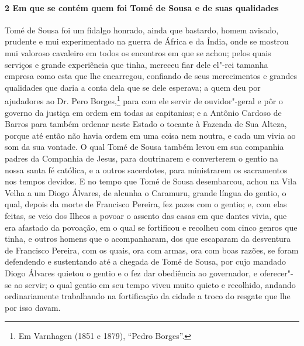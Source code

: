 \begin{linenumbers}
\paragraph{2 Em que se contém quem foi Tomé de Sousa e de suas qualidades} \quad
Tomé de Sousa foi um fidalgo honrado, ainda que bastardo, homem avisado, prudente e mui
experimentado na guerra de África e da Índia, onde se mostrou mui valoroso cavaleiro em
todos os encontros em que se achou; pelos quais serviços e grande experiência que tinha,
mereceu fiar dele el"-rei tamanha empresa como esta que lhe encarregou, confiando de seus
merecimentos e grandes qualidades que daria a conta dela que se dele esperava; a quem deu
por ajudadores ao Dr. Pero Borges,\footnote{ Em Varnhagen (1851 e 1879), ``Pedro
Borges''.} para com ele servir de ouvidor"-geral e pôr o governo da justiça em ordem em
todas as capitanias; e a Antônio Cardoso de Barros para também ordenar neste Estado o
tocante à Fazenda de Sua Alteza, porque até então não havia ordem em uma coisa nem noutra,
e cada um vivia ao som da sua vontade. O qual Tomé de Sousa também levou em sua companhia
padres da Companhia de Jesus, para doutrinarem e converterem o gentio na nossa santa fé
católica, e a outros sacerdotes, para ministrarem os sacramentos nos tempos devidos. E no
tempo que Tomé de Sousa desembarcou, achou na Vila Velha a um Diogo Álvares, de alcunha o
Caramuru, grande língua do gentio, o qual, depois da morte de Francisco Pereira, fez pazes
com o gentio; e, com elas feitas, se veio dos Ilheos a povoar o assento das casas em que
dantes vivia, que era afastado da povoação, em o qual se fortificou e recolheu com cinco
genros que tinha, e outros homens que o acompanharam, dos que escaparam da desventura de
Francisco Pereira, com os quais, ora com armas, ora com boas razões, se foram defendendo e
sustentando até a chegada de Tomé de Sousa, por cujo mandado Diogo Álvares quietou o
gentio e o fez dar obediência ao governador, e oferecer"-se ao servir; o qual gentio em seu
tempo viveu muito quieto e recolhido, andando ordinariamente trabalhando na fortificação
da cidade a troco do resgate que lhe por isso davam.


\end{linenumbers}
